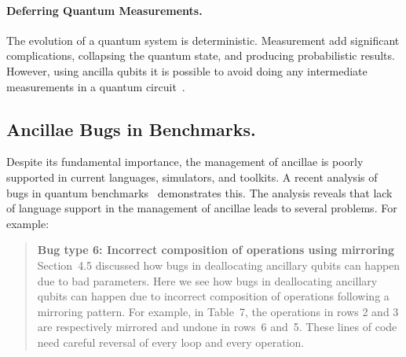 \documentclass[sigplan,10pt,review,anonymous]{acmart}
\begin{document}
\paragraph*{Deferring Quantum Measurements.} The evolution of a
quantum system is deterministic. Measurement add significant
complications, collapsing the quantum state, and producing
probabilistic results. However, using ancilla qubits it is possible to
avoid doing any intermediate measurements in a quantum
circuit~\cite{dewolf}. 

\subsection{Ancillae Bugs in Benchmarks.}
Despite its fundamental importance, the management of ancillae is
poorly supported in current languages, simulators, and toolkits. 
A recent analysis of bugs in quantum
benchmarks~\cite{DBLP:conf/oopsla/HuangM18} demonstrates this. The analysis
reveals that lack of language support in the management of ancillae leads to
several problems. For example: 
\begin{quote}
  \textbf{Bug type 6: Incorrect composition of operations using mirroring}
  Section~4.5 discussed how bugs in deallocating ancillary qubits can
  happen due to bad parameters. Here we see how bugs in deallocating
  ancillary qubits can happen due to incorrect composition of
  operations following a mirroring pattern. For example, in Table~7,
  the operations in rows 2 and 3 are respectively mirrored and undone
  in rows~6 and~5. These lines of code need careful reversal of every
  loop and every operation.
\end{quote}
\end{document}
